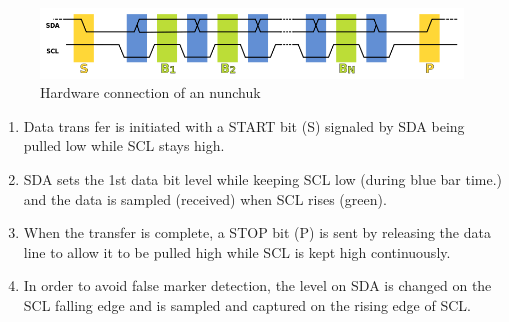 \begin{figure}[h]
\centering
\includegraphics[scale=0.4]{Figures/I2C}
\caption{Hardware connection of an nunchuk}
\label{fig:i2c}
\end{figure}


\begin{enumerate}
\item Data trans fer is initiated with a START bit (S) signaled by SDA being
pulled low while SCL stays high.
\item SDA sets the 1st data bit level while keeping SCL low (during blue bar
time.) and the data is sampled (received) when SCL rises (green).
\item When the transfer is complete, a STOP bit (P) is sent by releasing the
data line to allow it to be pulled high while SCL is kept high continuously.
\item In order to avoid false marker detection, the level on SDA is changed on
the SCL falling edge and is sampled and captured on the rising edge of SCL.
\end{enumerate}








